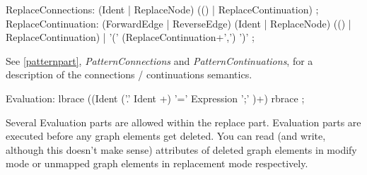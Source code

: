 \begin{rail}
  ReplaceConnections: (Ident | ReplaceNode) (() | ReplaceContinuation) ;
  ReplaceContinuation:  (ForwardEdge | ReverseEdge) (Ident | ReplaceNode) (() | ReplaceContinuation) |
    '(' (ReplaceContinuation+',') ')' ;    
\end{rail}
See \ref{patternpart}, \emph{PatternConnections} and \emph{PatternContinuations}, for a description of the connections / continuations semantics.

\begin{rail}    
   Evaluation:  lbrace ((Ident ('.' Ident +) '=' Expression ';' )+) rbrace ;
\end{rail}
Several Evaluation parts are allowed within the replace part. Evaluation parts are executed before any graph elements get deleted. You can read (and write, although this doesn't make sense) attributes of deleted graph elements in modify mode or unmapped graph elements in replacement mode respectively.
